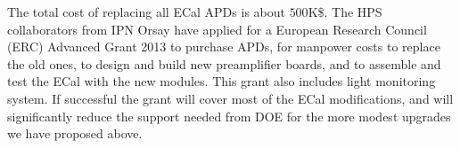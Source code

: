 The total cost of replacing all ECal APDs is about $500$K\$. The HPS collaborators from IPN Orsay have applied for a  
European Research Council (ERC) Advanced Grant 2013 to purchase APDs, for manpower costs to replace the old ones, to design and build 
new preamplifier boards, and to assemble and test the ECal with the new modules. This grant also includes light monitoring system. If successful the grant will cover most of the ECal modifications, and will significantly reduce the support needed from DOE for the more modest upgrades we have proposed above. 
